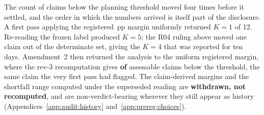 The count of claims below the planning threshold moved four times before it
settled, and the order in which the numbers arrived is itself part of the
disclosure. A first pass applying the registered \AuditMarginPP{}\,pp margin
uniformly returned $K = 1$ of 12. Re-reading the frozen label produced $K = 5$;
the R04 ruling above moved one claim out of the determinate set, giving the
$K = 4$ that was reported for ten days. Amendment~2 then returned the analysis
to the uniform registered margin, where the rev-3 recomputation gives
\textbf{\AuditBelowThresholdAtMedian{} of \AuditAssessable{}} assessable claims
below the threshold, the same claim the very first pass had flagged. The
claim-derived margins and the shortfall range computed under the superseded
reading are \textbf{withdrawn, not recomputed}, and are non-verdict-bearing
wherever they still appear as history
(Appendices~\ref{app:audit:history} and~\ref{app:prereg:choices}).

